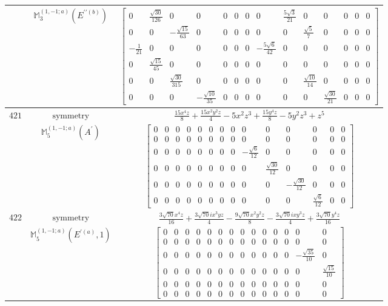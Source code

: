 \documentclass[fleqn,8pt,landscape]{jsarticle}
\begin{document}
\begin{longtable}{ccc}
$  $ & $ \mathbb{M}_{3}^{(1,-1;a)}(E^{\prime\prime(b)}) $ & $ \begin{bmatrix} 0 & \frac{\sqrt{30}}{126} & 0 & 0 & 0 & 0 & 0 & 0 & \frac{5 \sqrt{3}}{21} & 0 & 0 & 0 & 0 & 0 \\ 0 & 0 & - \frac{\sqrt{15}}{63} & 0 & 0 & 0 & 0 & 0 & 0 & \frac{\sqrt{5}}{7} & 0 & 0 & 0 & 0 \\ - \frac{1}{21} & 0 & 0 & 0 & 0 & 0 & 0 & - \frac{5 \sqrt{6}}{42} & 0 & 0 & 0 & 0 & 0 & 0 \\ 0 & \frac{\sqrt{15}}{45} & 0 & 0 & 0 & 0 & 0 & 0 & 0 & 0 & 0 & 0 & 0 & 0 \\ 0 & 0 & \frac{\sqrt{30}}{315} & 0 & 0 & 0 & 0 & 0 & 0 & \frac{\sqrt{10}}{14} & 0 & 0 & 0 & 0 \\ 0 & 0 & 0 & - \frac{\sqrt{10}}{35} & 0 & 0 & 0 & 0 & 0 & 0 & \frac{\sqrt{30}}{21} & 0 & 0 & 0 \end{bmatrix} $ \\ \hline
$ 421 $ & $ \text{symmetry} $ & $ \frac{15 x^{4} z}{8} + \frac{15 x^{2} y^{2} z}{4} - 5 x^{2} z^{3} + \frac{15 y^{4} z}{8} - 5 y^{2} z^{3} + z^{5} $ \\
$  $ & $ \mathbb{M}_{5}^{(1,-1;a)}(A^{\prime}) $ & $ \begin{bmatrix} 0 & 0 & 0 & 0 & 0 & 0 & 0 & 0 & 0 & 0 & 0 & 0 & 0 & 0 \\ 0 & 0 & 0 & 0 & 0 & 0 & 0 & 0 & 0 & 0 & 0 & 0 & 0 & 0 \\ 0 & 0 & 0 & 0 & 0 & 0 & 0 & 0 & - \frac{\sqrt{6}}{12} & 0 & 0 & 0 & 0 & 0 \\ 0 & 0 & 0 & 0 & 0 & 0 & 0 & 0 & 0 & \frac{\sqrt{30}}{12} & 0 & 0 & 0 & 0 \\ 0 & 0 & 0 & 0 & 0 & 0 & 0 & 0 & 0 & 0 & - \frac{\sqrt{30}}{12} & 0 & 0 & 0 \\ 0 & 0 & 0 & 0 & 0 & 0 & 0 & 0 & 0 & 0 & 0 & \frac{\sqrt{6}}{12} & 0 & 0 \end{bmatrix} $ \\ \hline
$ 422 $ & $ \text{symmetry} $ & $ \frac{3 \sqrt{70} x^{4} z}{16} + \frac{3 \sqrt{70} i x^{3} y z}{4} - \frac{9 \sqrt{70} x^{2} y^{2} z}{8} - \frac{3 \sqrt{70} i x y^{3} z}{4} + \frac{3 \sqrt{70} y^{4} z}{16} $ \\
$  $ & $ \mathbb{M}_{5}^{(1,-1;a)}(E^{\prime(a)},1) $ & $ \begin{bmatrix} 0 & 0 & 0 & 0 & 0 & 0 & 0 & 0 & 0 & 0 & 0 & 0 & 0 & 0 \\ 0 & 0 & 0 & 0 & 0 & 0 & 0 & 0 & 0 & 0 & 0 & 0 & 0 & 0 \\ 0 & 0 & 0 & 0 & 0 & 0 & 0 & 0 & 0 & 0 & 0 & 0 & - \frac{\sqrt{35}}{10} & 0 \\ 0 & 0 & 0 & 0 & 0 & 0 & 0 & 0 & 0 & 0 & 0 & 0 & 0 & \frac{\sqrt{15}}{10} \\ 0 & 0 & 0 & 0 & 0 & 0 & 0 & 0 & 0 & 0 & 0 & 0 & 0 & 0 \\ 0 & 0 & 0 & 0 & 0 & 0 & 0 & 0 & 0 & 0 & 0 & 0 & 0 & 0 \end{bmatrix} $ \\ \hline

\end{longtable}
\end{document}
